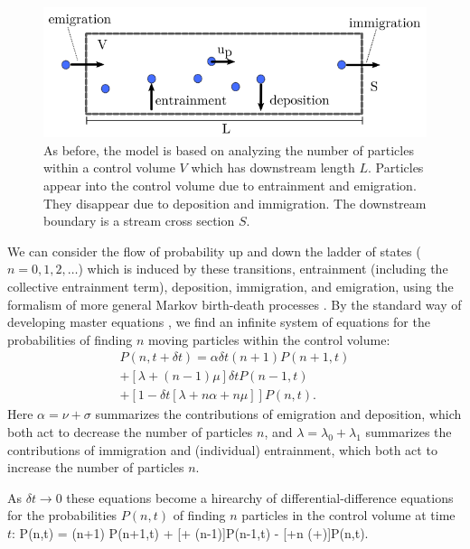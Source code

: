 \begin{figure}
  \includegraphics[width=.98\linewidth]{./figures/controlvol.png}
  \caption{As before, the model is based on analyzing the number of particles within a control volume $V$ which has downstream length $L$. Particles appear into the control volume due to entrainment and emigration. They disappear due to deposition and immigration. The downstream boundary is a stream cross section $S$.  \label{fig:anceywindow} }
\end{figure} 

We can consider the flow of probability up and down the ladder of states ($n=0,1,2,\dots$) which is induced by these transitions, entrainment (including the collective entrainment term), deposition, immigration, and emigration, using the formalism of more general Markov birth-death processes \citep{Cox1965, Pielou1977}. 
By the standard way of developing master equations \citep[e.g.][]{Cox1965}, we find an infinite system of equations for the probabilities of finding $n$ moving particles within the control volume: 
\begin{multline} P(n,t+\delta t) = \alpha \delta t (n+1)P(n+1,t) \\+  [\lambda + (n-1)\mu]\delta t P(n-1,t) \\ + [1-\delta t[\lambda + n\alpha + n\mu]]P(n,t). \label{eq:ancey2008master}\end{multline}
Here $\alpha = \nu + \sigma$ summarizes the contributions of emigration and deposition, which both act to decrease the number of particles $n$, and $\lambda = \lambda_0 + \lambda_1$ summarizes the contributions of immigration and (individual) entrainment, which both act to increase the number of particles $n$. 

As $\delta t\rightarrow 0$ these equations become a hirearchy of differential-difference equations for the probabilities $P(n,t)$ of finding $n$ particles in the control volume at time $t$: 
\be {}P(n,t) = (n+1) \alpha P(n+1,t) + [\lambda + (n-1)\mu]P(n-1,t) - [\lambda +n (\alpha+\mu)]P(n,t). \label{eq:anc2008} \ee 

